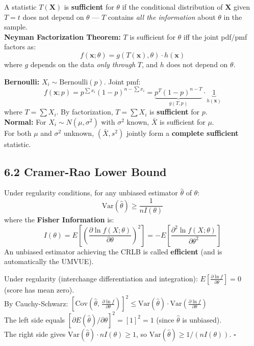 \documentclass[12pt]{article}
\begin{document}
\begin{defbox}
A statistic $T(\mathbf X)$ is \textbf{sufficient} for $\theta$ if the conditional distribution of $\mathbf X$ given $T=t$ does not depend on $\theta$ --- $T$ contains \textit{all the information} about $\theta$ in the sample.\\[6pt]
\textbf{Neyman Factorization Theorem:} $T$ is sufficient for $\theta$ iff the joint pdf/pmf factors as:
\[f(\mathbf x;\theta)=g(T(\mathbf x),\theta)\cdot h(\mathbf x)\]
where $g$ depends on the data \textit{only through} $T$, and $h$ does not depend on $\theta$.
\end{defbox}

\begin{examplebox}
\textbf{Bernoulli:} $X_i\sim\text{Bernoulli}(p)$. Joint pmf:
\[f(\mathbf x;p)=p^{\sum x_i}(1-p)^{n-\sum x_i}=\underbrace{p^T(1-p)^{n-T}}_{g(T,p)}\cdot\underbrace{1}_{h(\mathbf x)}\]
where $T=\sum X_i$. By factorization, $T=\sum X_i$ is \textbf{sufficient} for $p$.\\[6pt]
\textbf{Normal:} For $X_i\sim N(\mu,\sigma^2)$ with $\sigma^2$ known, $\bar X$ is sufficient for $\mu$.\\
For both $\mu$ and $\sigma^2$ unknown, $(\bar X, s^2)$ jointly form a \textbf{complete sufficient} statistic.
\end{examplebox}

\subsection{6.2 Cramer-Rao Lower Bound}

\begin{thmbox}
Under regularity conditions, for any unbiased estimator $\hat\theta$ of $\theta$:
\[\text{Var}(\hat\theta)\geq\frac{1}{nI(\theta)}\]
where the \textbf{Fisher Information} is:
\[I(\theta)=E\!\left[\left(\frac{\partial\ln f(X;\theta)}{\partial\theta}\right)^2\right]=-E\!\left[\frac{\partial^2\ln f(X;\theta)}{\partial\theta^2}\right]\]
An unbiased estimator achieving the CRLB is called \textbf{efficient} (and is automatically the UMVUE).
\end{thmbox}

\begin{derivbox}
Under regularity (interchange differentiation and integration):
$E\!\left[\frac{\partial\ln f}{\partial\theta}\right]=0$ (score has mean zero).\\
By Cauchy-Schwarz: $\left[\text{Cov}\!\left(\hat\theta,\,\frac{\partial\ln f}{\partial\theta}\right)\right]^2\leq\text{Var}(\hat\theta)\cdot\text{Var}\!\left(\frac{\partial\ln f}{\partial\theta}\right)$\\[4pt]
The left side equals $[\partial E(\hat\theta)/\partial\theta]^2=[1]^2=1$ (since $\hat\theta$ is unbiased).\\
The right side gives $\text{Var}(\hat\theta)\cdot nI(\theta)\geq1$, so $\text{Var}(\hat\theta)\geq1/(nI(\theta))$. \hfill$\square$
\end{derivbox}
\end{document}
